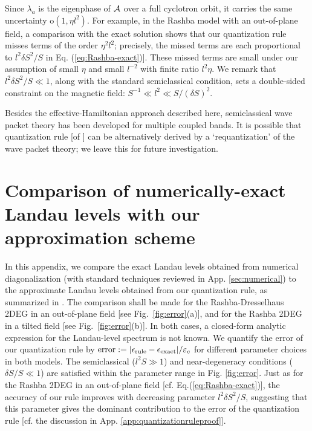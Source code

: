 \documentclass[aps, showpacs, twocolumn, notitlepage, superscriptaddress]{revtex4-1}
\begin{document}
Since $\lambda_a$ is the eigenphase of ${\cal A}$ over a full cyclotron orbit, it carries the same uncertainty $\text{o}(1, \eta l^2)$. For example, in the Rashba model with an out-of-plane field, a comparison with the exact solution shows that our quantization rule misses terms of the order $\eta^2 l^2$; precisely, the missed terms are each proportional to  $l^2\delta S^2/S$ in Eq. (\ref{eq:Rashba-exact})]. These missed terms are small under our assumption of small $\eta$ and small $l^{-2}$ with finite ratio $l^2\eta$. We remark that $l^2\delta S^2/S\ll 1$, along with the standard semiclassical condition, sets a double-sided constraint on the magnetic field: $S^{-1} \ll l^2 \ll S/(\delta S)^2$. 


Besides the effective-Hamiltonian approach described here, semiclassical wave packet theory has been developed for multiple coupled bands\cite{culcer_coherent_2005}. It is possible that quantization rule [of ] can be alternatively derived by a `requantization' of the wave packet theory\cite{xiao_berry_2010}; we leave this for future investigation.  

\section{Comparison of numerically-exact Landau levels with our approximation scheme}\label{app:approximatevsexact}

In this appendix, we compare the exact Landau levels obtained from numerical diagonalization (with standard techniques reviewed in App. \ref{sec:numerical}) to the approximate Landau levels obtained from our quantization rule, as summarized in . The comparison shall be made for the Rashba-Dresselhaus 2DEG in an out-of-plane field [see Fig.\ \ref{fig:error}(a)], and for the Rashba 2DEG in a tilted field [see Fig.\ \ref{fig:error}(b)]. In both cases, a closed-form analytic expression for the Landau-level spectrum is not known. We quantify the error of our quantization rule by $\text{error}:=|\epsilon_\text{rule}-\epsilon_\text{exact}|/\varepsilon_c$ for different parameter choices in both models. The semiclassical ($l^2 S\gg 1$) and near-degeneracy conditions ($\delta S/S\ll 1$) are satisfied within the parameter range in Fig. \ref{fig:error}. Just as for the Rashba 2DEG in an out-of-plane field [cf. Eq.(\ref{eq:Rashba-exact})], the accuracy of our rule improves with decreasing parameter $l^2\delta S^2/S$,  suggesting that this parameter gives the dominant contribution to the error of the quantization rule [cf. the discussion in App. \ref{app:quantizationruleproof}].
\end{document}
